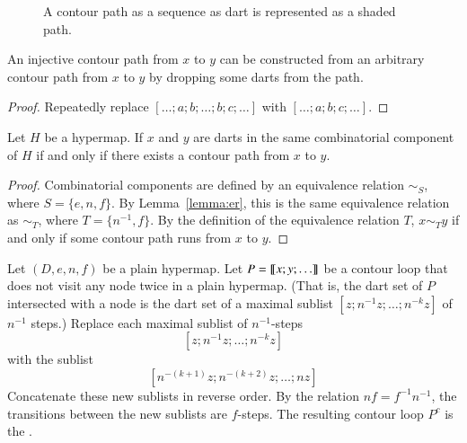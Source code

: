 \begin{figure}[htb]
\centering
{}
\caption{A contour path as a sequence as dart is represented as a
shaded path.}
\label{fig:shade-dart}
\end{figure}

\begin{lemma} 
An injective contour path from
  $x$ to $y$ can be constructed from an arbitrary contour path from
  $x$ to $y$ by dropping some darts from the path.
\end{lemma}

\begin{proof} Repeatedly replace $[\ldots;a;b;\ldots;b;c;\ldots]$ with
$[\ldots;a;b;c;\ldots]$.
\end{proof}





\begin{lemma}\label{lemma:connect-contour}  
Let $H$ be a hypermap.
If $x$ and $y$ are darts in the same combinatorial component of $H$ if and only if
there exists a contour path from $x$ to $y$.
\end{lemma}

\begin{proof} 
Combinatorial components are defined by an equivalence relation $\sim_S$, where
$S = \{e,n,f\}$.  By Lemma~\ref{lemma:er}, this is the same equivalence relation as
$\sim_T$, where $T = \{n^{-1},f\}$.  By the definition of the equivalence relation $T$,
$x\sim_T y$ if and only if some contour path runs from $x$ to $y$.
\end{proof}
%

\begin{definition}[complement] 
Let $(D,e,n,f)$ be a plain hypermap.
Let $P={\llbracket{x;y;\ldots}\rrbracket}$ be a contour loop that does not visit any node
twice in a plain hypermap.   (That is, the dart set of $P$ intersected with a node
is the dart set of a maximal sublist $[z;n^{-1}z;\ldots;n^{-k}z]$ of $n^{-1}$ steps.)
 Replace each maximal sublist of
$n^{-1}$-steps
\[ 
[z;n^{-1} z; \ldots; n^{-k} z]
\] 
with the sublist
\[ 
[n^{-(k+1)} z;n^{-(k+2)} z;\ldots; n z]
\] 
Concatenate these new sublists in reverse order.  By the relation $n f = f^{-1} n^{-1}$,
the transitions between the new sublists are $f$-steps.
The resulting contour loop $P^c$
is the . 
\end{definition}


